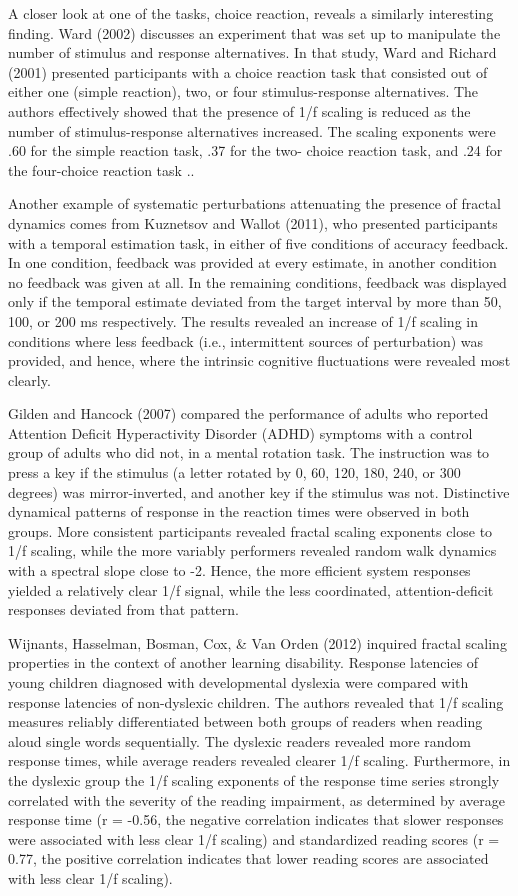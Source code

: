 \documentclass[12pt,]{book}
\begin{document}
A closer look at one of the tasks, choice reaction, reveals a similarly interesting finding. Ward (2002) discusses an experiment that was set up to manipulate the number of stimulus and response alternatives. In that study, Ward and Richard (2001) presented participants with a choice reaction task that consisted out of either one (simple reaction), two, or four stimulus-response alternatives. The authors effectively showed that the presence of 1/f scaling is reduced as the number of stimulus-response alternatives increased. The scaling exponents were .60 for the simple reaction task, .37 for the two- choice reaction task, and .24 for the four-choice reaction task ..

Another example of systematic perturbations attenuating the presence of fractal dynamics comes from Kuznetsov and Wallot (2011), who presented participants with a temporal estimation task, in either of five conditions of accuracy feedback. In one condition, feedback was provided at every estimate, in another condition no feedback was given at all. In the remaining conditions, feedback was displayed only if the temporal estimate deviated from the target interval by more than 50, 100, or 200 ms respectively. The results revealed an increase of 1/f scaling in conditions where less feedback (i.e., intermittent sources of perturbation) was provided, and hence, where the intrinsic cognitive fluctuations were revealed most clearly.

Gilden and Hancock (2007) compared the performance of adults who reported Attention Deficit Hyperactivity Disorder (ADHD) symptoms with a control group of adults who did not, in a mental rotation task. The instruction was to press a key if the stimulus (a letter rotated by 0, 60, 120, 180, 240, or 300 degrees) was mirror-inverted, and another key if the stimulus was not. Distinctive dynamical patterns of response in the reaction times were observed in both groups. More consistent participants revealed fractal scaling exponents close to 1/f scaling, while the more variably performers revealed random walk dynamics with a spectral slope close to -2. Hence, the more efficient system responses yielded a relatively clear 1/f signal, while the less coordinated, attention-deficit responses deviated from that pattern.

Wijnants, Hasselman, Bosman, Cox, \& Van Orden (2012) inquired fractal scaling properties in the context of another learning disability. Response latencies of young children diagnosed with developmental dyslexia were compared with response latencies of non-dyslexic children. The authors revealed that 1/f scaling measures reliably differentiated between both groups of readers when reading aloud single words sequentially. The dyslexic readers revealed more random response times, while average readers revealed clearer 1/f scaling. Furthermore, in the dyslexic group the 1/f scaling exponents of the response time series strongly correlated with the severity of the reading impairment, as determined by average response time (r = -0.56, the negative correlation indicates that slower responses were associated with less clear 1/f scaling) and standardized reading scores (r = 0.77, the positive correlation indicates that lower reading scores are associated with less clear 1/f scaling).
\end{document}
